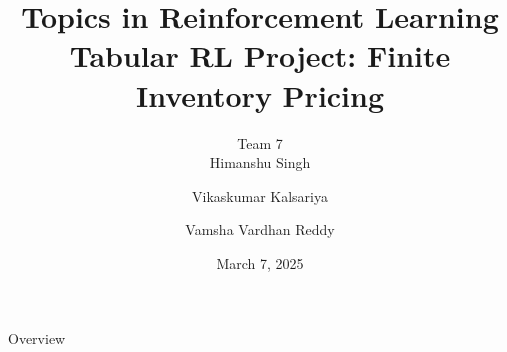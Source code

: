 \documentclass[9pt]{slides}
\title{{\normalsize Topics in Reinforcement Learning} \\ Tabular RL Project: Finite Inventory Pricing}
\author{{\normalsize Team 7} \\ Himanshu Singh \and Vikaskumar Kalsariya \and Vamsha Vardhan Reddy}
\date{March 7, 2025}
\begin{document}
\begin{frame}
    \titlepage
\end{frame}

\begin{frame}{Overview}
    \tableofcontents
\end{frame}




\end{document}
